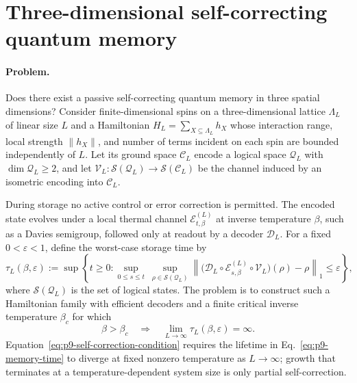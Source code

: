 \section{Three-dimensional self-correcting quantum memory}
\label{sec:op_e4a8ae208470f288}

\paragraph{Problem.}
Does there exist a passive self-correcting quantum memory in three spatial
dimensions?  Consider finite-dimensional spins on a three-dimensional lattice
$\Lambda_L$ of linear size $L$ and a Hamiltonian
$H_L=\sum_{X\subseteq\Lambda_L}h_X$ whose interaction range, local strength
$\lVert h_X\rVert$, and number of terms incident on each spin are bounded
independently of $L$.  Let its ground space $\mathcal C_L$ encode a logical
space $\mathcal Q_L$ with $\dim\mathcal Q_L\ge2$, and let
$\mathcal V_L:\mathcal S(\mathcal Q_L)\to\mathcal S(\mathcal C_L)$ be the
channel induced by an isometric encoding into $\mathcal C_L$.

During storage no active control or error correction is permitted.  The
encoded state evolves under a local thermal channel
$\mathcal E_{t,\beta}^{(L)}$ at inverse temperature $\beta$, such as a Davies
semigroup, followed only at readout by a decoder $\mathcal D_L$.  For a fixed
$0<\varepsilon<1$, define the worst-case storage time by
\begin{equation}
  \tau_L(\beta,\varepsilon)
  :=\sup\!\left\{t\ge0:
       \sup_{0\le s\le t}\ \sup_{\rho\in\mathcal S(\mathcal Q_L)}
       \left\|
         \bigl(\mathcal D_L\circ\mathcal E_{s,\beta}^{(L)}
         \circ\mathcal V_L\bigr)(\rho)-\rho
       \right\|_1
       \le\varepsilon\right\},
  \label{eq:p9-memory-time}
\end{equation}
where $\mathcal S(\mathcal Q_L)$ is the set of logical states.  The problem is
to construct such a Hamiltonian family with efficient decoders and a finite
critical inverse temperature $\beta_c$ for which
\begin{equation}
  \beta>\beta_c
  \quad\Longrightarrow\quad
  \lim_{L\to\infty}\tau_L(\beta,\varepsilon)=\infty.
  \label{eq:p9-self-correction-condition}
\end{equation}
Equation~\eqref{eq:p9-self-correction-condition} requires the lifetime in
Eq.~\eqref{eq:p9-memory-time} to diverge at fixed nonzero temperature as
$L\to\infty$; growth that terminates at a temperature-dependent system size is
only partial self-correction.

